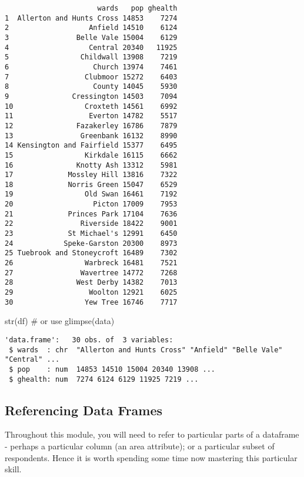 \documentclass[
  letterpaper,
  krantz2]{style/krantz}
\newenvironment{Shaded}{\begin{snugshade}}{\end{snugshade}}
\newcommand{\CommentTok}[1]{\textcolor[rgb]{0.37,0.37,0.37}{#1}}
\newcommand{\FunctionTok}[1]{\textcolor[rgb]{0.28,0.35,0.67}{#1}}
\newcommand{\NormalTok}[1]{\textcolor[rgb]{0.00,0.23,0.31}{#1}}
\begin{document}
\begin{verbatim}
                      wards   pop ghealth
1  Allerton and Hunts Cross 14853    7274
2                   Anfield 14510    6124
3                Belle Vale 15004    6129
4                   Central 20340   11925
5                 Childwall 13908    7219
6                    Church 13974    7461
7                  Clubmoor 15272    6403
8                    County 14045    5930
9               Cressington 14503    7094
10                 Croxteth 14561    6992
11                  Everton 14782    5517
12               Fazakerley 16786    7879
13                Greenbank 16132    8990
14 Kensington and Fairfield 15377    6495
15                 Kirkdale 16115    6662
16               Knotty Ash 13312    5981
17             Mossley Hill 13816    7322
18             Norris Green 15047    6529
19                 Old Swan 16461    7192
20                   Picton 17009    7953
21             Princes Park 17104    7636
22                Riverside 18422    9001
23             St Michael's 12991    6450
24            Speke-Garston 20300    8973
25 Tuebrook and Stoneycroft 16489    7302
26                 Warbreck 16481    7521
27                Wavertree 14772    7268
28               West Derby 14382    7013
29                  Woolton 12921    6025
30                 Yew Tree 16746    7717
\end{verbatim}

\begin{Shaded}
\begin{Highlighting}[]
\FunctionTok{str}\NormalTok{(df) }\CommentTok{\# or use glimpse(data) }
\end{Highlighting}
\end{Shaded}

\begin{verbatim}
'data.frame':   30 obs. of  3 variables:
 $ wards  : chr  "Allerton and Hunts Cross" "Anfield" "Belle Vale" "Central" ...
 $ pop    : num  14853 14510 15004 20340 13908 ...
 $ ghealth: num  7274 6124 6129 11925 7219 ...
\end{verbatim}

\hypertarget{referencing-data-frames}{%
\subsection{Referencing Data Frames}\label{referencing-data-frames}}

Throughout this module, you will need to refer to particular parts of a
dataframe - perhaps a particular column (an area attribute); or a
particular subset of respondents. Hence it is worth spending some time
now mastering this particular skill.
\end{document}
